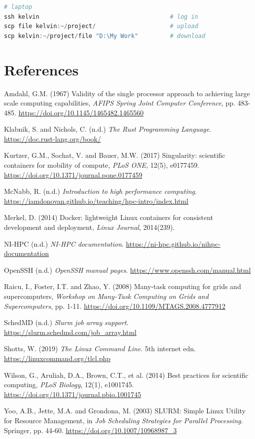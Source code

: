 \begin{lstlisting}[language=powershell]
# laptop
ssh kelvin                                     # log in
scp file kelvin:~/project/                     # upload
scp kelvin:~/project/file "D:\My Work"         # download
\end{lstlisting}

\section{References}\label{references}

Amdahl, G.M. (1967) \textquotesingle Validity of the single processor approach to achieving large scale computing capabilities\textquotesingle, \emph{AFIPS Spring Joint Computer Conference}, pp. 483-485. \url{https://doi.org/10.1145/1465482.1465560}

Klabnik, S. and Nichols, C. (n.d.) \emph{The Rust Programming Language}. \url{https://doc.rust-lang.org/book/}

Kurtzer, G.M., Sochat, V. and Bauer, M.W. (2017) \textquotesingle Singularity: scientific containers for mobility of compute\textquotesingle, \emph{PLoS ONE}, 12(5), e0177459. \url{https://doi.org/10.1371/journal.pone.0177459}

McNabb, R. (n.d.) \emph{Introduction to high performance computing}. \url{https://iamdonovan.github.io/teaching/hpc-intro/index.html}

Merkel, D. (2014) \textquotesingle Docker: lightweight Linux containers for consistent development and deployment\textquotesingle, \emph{Linux Journal}, 2014(239).

NI-HPC (n.d.) \emph{NI-HPC documentation}. \url{https://ni-hpc.github.io/nihpc-documentation}

OpenSSH (n.d.) \emph{OpenSSH manual pages}. \url{https://www.openssh.com/manual.html}

Raicu, I., Foster, I.T. and Zhao, Y. (2008) \textquotesingle Many-task computing for grids and supercomputers\textquotesingle, \emph{Workshop on Many-Task Computing on Grids and Supercomputers}, pp. 1-11. \url{https://doi.org/10.1109/MTAGS.2008.4777912}

SchedMD (n.d.) \emph{Slurm job array support}. \url{https://slurm.schedmd.com/job_array.html}

Shotts, W. (2019) \emph{The Linux Command Line}. 5th internet edn. \url{https://linuxcommand.org/tlcl.php}

Wilson, G., Aruliah, D.A., Brown, C.T., et al. (2014) \textquotesingle Best practices for scientific computing\textquotesingle, \emph{PLoS Biology}, 12(1), e1001745. \url{https://doi.org/10.1371/journal.pbio.1001745}

Yoo, A.B., Jette, M.A. and Grondona, M. (2003) \textquotesingle SLURM: Simple Linux Utility for Resource Management\textquotesingle, in \emph{Job Scheduling Strategies for Parallel Processing}. Springer, pp. 44-60. \url{https://doi.org/10.1007/10968987_3}

